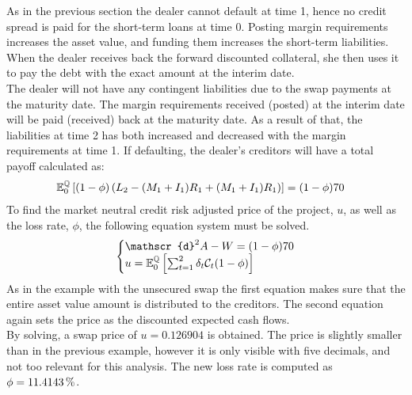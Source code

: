 \documentclass[main.tex]{subfiles}
\begin{document}
            As in the previous section the dealer cannot default at time 1,
            hence no credit spread is paid for the short-term loans at time 0.
            Posting margin requirements increases the asset value,
            and funding them increases the short-term liabilities.
            When the dealer receives back the forward discounted collateral,
            she then uses it to pay the debt with the exact amount at the interim date.
            \\
            The dealer will not have any contingent liabilities due to the swap payments at the maturity date.
            The margin requirements received (posted) at the interim date will be paid (received) back at the maturity date.
            As a result of that,
            the liabilities at time 2 has both increased and decreased with the margin requirements at time 1.
            If defaulting, the dealer's creditors will have a total payoff calculated as:
            \begin{align}
                \mathbb{E}_{0}^{\mathbb{Q}}\left[
                    (1-\phi)\left(
                        L_{2}
                        -(M_1+I_1)R_{1}
                        +(M_1+I_1)R_{1}
                    \right)
                \right] 
                &= (1-\phi)\num{70}
            \end{align}
            To find the market neutral credit risk adjusted price of the project, $u$, as well as the loss rate, $\phi$,
            the following equation system must be solved.
            \begin{equation}
                \left\{\begin{array}{@{}l@{}}
                    \mathscr{d}^{2} A - W
                    =
                    (1-\phi)\num{70}
                    \\
                    u =
                    \mathbb{E}_{0}^{\rnmeasure}\left[
                        \sum_{t=1}^{2}
                        \delta_{t}\mathcal{C}_{t}
                        (1-\phi)
                    \right]
                \end{array}\right.
            \end{equation}
            As in the example with the unsecured swap the first equation makes sure
            that the entire asset value amount is distributed to the creditors.
            The second equation again sets the price as the discounted expected cash flows.
            \\
            By solving, a swap price of $u=\num{0.126904}$ is obtained.
            The price is slightly smaller than in the previous example,
            however it is only visible with five decimals,
            and not too relevant for this analysis.
            The new loss rate is computed as $\phi = \pct{0.114143}$.
\end{document}
